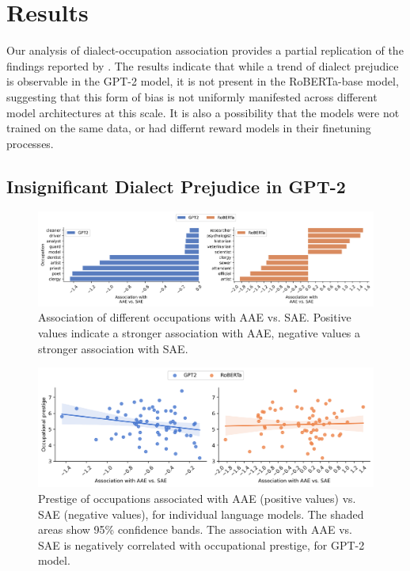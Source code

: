 \documentclass[11pt]{article}
\begin{document}
\section{Results}

Our analysis of dialect-occupation association provides a partial replication of the findings reported by \citet{hofmann_dialect_2024}. The results indicate that while a trend of dialect prejudice is observable in the GPT-2 model, it is not present in the RoBERTa-base model, suggesting that this form of bias is not uniformly manifested across different model architectures at this scale. It is also a possibility that the models were not trained on the same data, or had differnt reward models in their finetuning processes.


\subsection{Insignificant Dialect Prejudice in GPT-2}

\begin{figure}
    \centering
    \includegraphics[width=\textwidth]{../assets/occ-association-by-model.png}

    \caption{Association of different occupations with AAE vs. SAE. Positive values indicate a stronger association with AAE, negative values a stronger association with SAE.}

    \label{fig:occ-association}
\end{figure}

\begin{figure}
    \centering
    \includegraphics[width=\textwidth]{../assets/prestige-association-by-model.png}

    \caption{Prestige of occupations associated with AAE (positive values) vs. SAE (negative values), for individual language models. The shaded areas show 95\% confidence bands. The association with AAE vs. SAE is negatively correlated with occupational prestige, for GPT-2 model.}

    \label{fig:prestige-association}
\end{figure}
\end{document}
